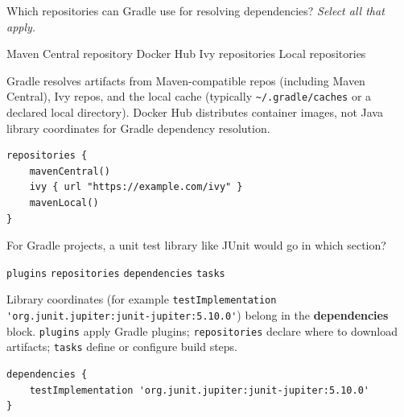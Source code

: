 



\question[4]
Which repositories can Gradle use for resolving dependencies? \emph{Select all that apply.}
\begin{checkboxes}
  \CorrectChoice Maven Central repository
  \choice Docker Hub
  \CorrectChoice Ivy repositories
  \CorrectChoice Local repositories
\end{checkboxes}
\begin{solution}
  Gradle resolves artifacts from Maven-compatible repos (including Maven Central), Ivy repos, and the local cache (typically \lstinline[style=bashinline]|~/.gradle/caches| or a declared local directory). Docker Hub distributes container images, not Java library coordinates for Gradle dependency resolution.
\begin{lstlisting}[style=java]
repositories {
    mavenCentral()
    ivy { url "https://example.com/ivy" }
    mavenLocal()
}
\end{lstlisting}
\end{solution}

\question[4]
For Gradle projects, a unit test library like JUnit would go in which section?
\begin{choices}
  \choice \texttt{plugins}
  \choice \texttt{repositories}
  \CorrectChoice \texttt{dependencies}
  \choice \texttt{tasks}
\end{choices}
\begin{solution}
  Library coordinates (for example \lstinline[style=javainline]|testImplementation 'org.junit.jupiter:junit-jupiter:5.10.0'|) belong in the \textbf{dependencies} block. \texttt{plugins} apply Gradle plugins; \texttt{repositories} declare where to download artifacts; \texttt{tasks} define or configure build steps.
\begin{lstlisting}[style=java]
dependencies {
    testImplementation 'org.junit.jupiter:junit-jupiter:5.10.0'
}
\end{lstlisting}
\end{solution}

